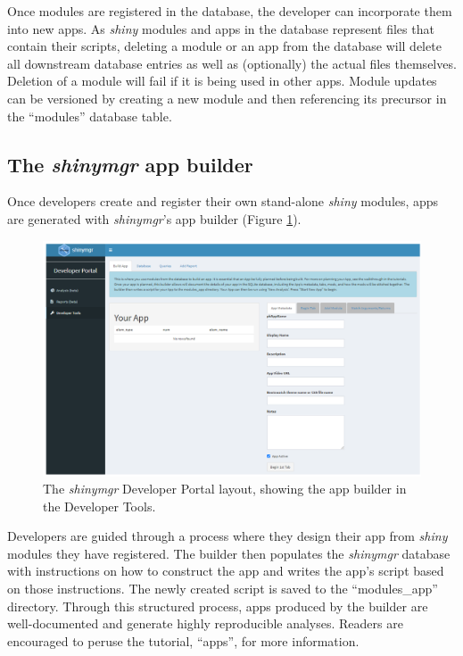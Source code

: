 Once modules are registered in the database, the developer can incorporate them into new apps. As \emph{shiny} modules and apps in the database represent files that contain their scripts, deleting a module or an app from the database will delete all downstream database entries as well as (optionally) the actual files themselves. Deletion of a module will fail if it is being used in other apps. Module updates can be versioned by creating a new module and then referencing its precursor in the ``modules'' database table.

\subsection{\texorpdfstring{The \emph{shinymgr} app builder}{The shinymgr app builder}}\label{the-shinymgr-app-builder}

Once developers create and register their own stand-alone \emph{shiny} modules, apps are generated with \emph{shinymgr}'s app builder (Figure \ref{fig:fig5}).

\begin{figure}[h]
\includegraphics[width=1\linewidth]{images/figure5} \caption{The \textit{shinymgr} Developer Portal layout, showing the app builder in the Developer Tools.}\label{fig:fig5}
\end{figure}

Developers are guided through a process where they design their app from \emph{shiny} modules they have registered. The builder then populates the \emph{shinymgr} database with instructions on how to construct the app and writes the app's script based on those instructions. The newly created script is saved to the ``modules\_app'' directory. Through this structured process, apps produced by the builder are well-documented and generate highly reproducible analyses. Readers are encouraged to peruse the tutorial, ``apps'', for more information.

